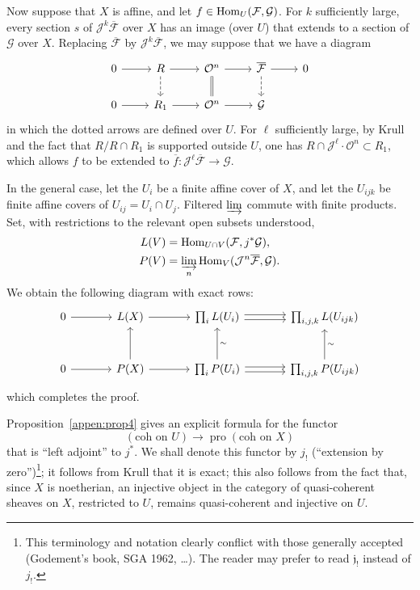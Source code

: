 Now suppose that $X$ is affine, and let $f\in\operatorname{Hom}_U(\mathcal F,\mathcal G)$. For $k$ sufficiently large, every section $s$ of $\mathcal J^k\overline{\mathcal F}$ over $X$ has an image (over $U$) that extends to a section of $\mathcal G$ over $X$. Replacing $\overline{\mathcal F}$ by $\mathcal J^k\overline{\mathcal F}$, we may suppose that we have a diagram
\[
\begin{tikzcd}
0 \ar[r] & R \ar[r] \ar[d,dashed] & \mathcal{O}^{n} \ar[r] \ar[d,equals] & \overline{\mathcal F} \ar[r] \ar[d,dashed] & 0 \\
0 \ar[r] & R_1 \ar[r] & \mathcal{O}^{n} \ar[r] & \mathcal G
\end{tikzcd}
\]
in which the dotted arrows are defined over $U$. For $\ell$ sufficiently large, by Krull and the fact that $R/R\cap R_1$ is supported outside $U$, one has $R\cap\mathcal J^{\ell}\cdot\mathcal O^n\subset R_1$, which allows $f$ to be extended to $\overline f:\mathcal J^{\ell}\overline{\mathcal F}\to\mathcal G$.

In the general case, let the $U_i$ be a finite affine cover of $X$, and let the $U_{ijk}$ be finite affine covers of $U_{ij}=U_i\cap U_j$. Filtered $\varinjlim$ commute with finite products. Set, with restrictions to the relevant open subsets understood,
\[
\begin{aligned}
L(V)&=\operatorname{Hom}_{U\cap V}(\mathcal F,j^*\mathcal G),\\
P(V)&=\varinjlim_n\operatorname{Hom}_V(\mathcal J^n\overline{\mathcal F},\mathcal G).
\end{aligned}
\]
We obtain the following diagram with exact rows:
\[
\begin{tikzcd}[column sep=large,row sep=large]
0 \ar[r] & L(X) \ar[r]
 & \prod_i L(U_i) \ar[r,shift left=.5ex] \ar[r,shift right=.5ex]
 & \prod_{i,j,k}L(U_{ijk}) \\
0 \ar[r] & P(X) \ar[r] \ar[u]
 & \prod_i P(U_i) \ar[r,shift left=.5ex] \ar[r,shift right=.5ex] \ar[u,"\sim"']
 & \prod_{i,j,k}P(U_{ijk}) \ar[u,"\sim"']
\end{tikzcd}
\]
which completes the proof.

Proposition~\ref{appen:prop4} gives an explicit formula for the functor
\[
(\text{coh on }U)\to\operatorname{pro}(\text{coh on }X)
\]
that is ``left adjoint'' to $j^*$. We shall denote this functor by $j_!$
(``extension by zero'')\footnote{This terminology and notation clearly conflict with those generally accepted (Godement's book, SGA 1962, \dots). The reader may prefer to read $\mathfrak{j}_!$ instead of $j_!$.};
it follows from Krull that it is exact; this also follows from the fact that,
since $X$ is noetherian, an injective object in the category of
quasi-coherent sheaves on $X$, restricted to $U$, remains quasi-coherent and injective on $U$.

